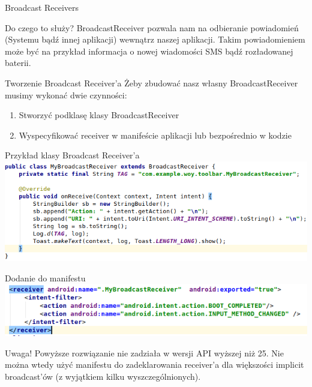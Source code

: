 \documentclass{beamer}
\begin{document}
\begin{frame}{Broadcast Receivers}

\begin{block}{Do czego to służy?}
	BroadcastReceiver pozwala nam na odbieranie powiadomień (Systemu bądź innej aplikacji) wewnątrz naszej aplikacji. Takim powiadomieniem może być na przykład informacja o nowej wiadomości SMS bądź rozładowanej baterii.
\end{block}
\end{frame}


\begin{frame}{Tworzenie Broadcast Receiver'a}
	Żeby zbudować nasz własny BroadcastReceiver musimy wykonać dwie czynności:
	\begin{enumerate}
		\item Stworzyć podklasę klasy BroadcastReceiver
		\item Wyspecyfikować receiver w manifeście aplikacji lub bezpośrednio w kodzie
	\end{enumerate}
\end{frame}


\begin{frame}{Przykład klasy Broadcast Receiver'a}
	\includegraphics[width=\textwidth]{receiver}
\end{frame}


\begin{frame}{Dodanie do manifestu}
	\includegraphics[width=\textwidth]{manifest}
	\begin{block}{Uwaga!}
		Powyższe rozwiązanie nie zadziała w wersji API wyższej niż 25. Nie można wtedy użyć manifestu do zadeklarowania receiver'a dla większości implicit broadcast'ów (z wyjątkiem kilku wyszczególnionych).
	\end{block}
\end{frame}
\end{document}
